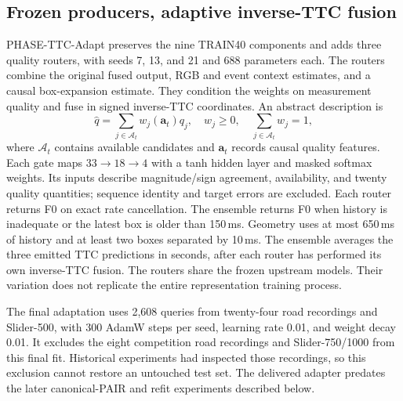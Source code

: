 \documentclass[twocolumn,letterpaper]{article}
\begin{document}
\subsection{Frozen producers, adaptive inverse-TTC fusion}
PHASE-TTC-Adapt preserves the nine TRAIN40 components and adds three quality routers, with seeds 7, 13, and 21 and 688 parameters each. The routers combine the original fused output, RGB and event context estimates, and a causal box-expansion estimate. They condition the weights on measurement quality and fuse in signed inverse-TTC coordinates. An abstract description is
\begin{equation}
 \widehat q=\sum_{j\in\mathcal A_t}w_j(\mathbf a_t)q_j,
 \quad w_j\geq0,\quad \sum_{j\in\mathcal A_t}w_j=1,
\label{eq:router}
\end{equation}
where $\mathcal A_t$ contains available candidates and $\mathbf a_t$ records causal quality features. Each gate maps $33\!\rightarrow\!18\!\rightarrow\!4$ with a tanh hidden layer and masked softmax weights. Its inputs describe magnitude/sign agreement, availability, and twenty quality quantities; sequence identity and target errors are excluded. Each router returns F0 on exact rate cancellation. The ensemble returns F0 when history is inadequate or the latest box is older than 150\,ms. Geometry uses at most 650\,ms of history and at least two boxes separated by 10\,ms. The ensemble averages the three emitted TTC predictions in seconds, after each router has performed its own inverse-TTC fusion. The routers share the frozen upstream models. Their variation does not replicate the entire representation training process.

The final adaptation uses 2,608 queries from twenty-four road recordings and Slider-500, with 300 AdamW steps per seed, learning rate 0.01, and weight decay 0.01. It excludes the eight competition road recordings and Slider-750/1000 from this final fit. Historical experiments had inspected those recordings, so this exclusion cannot restore an untouched test set. The delivered adapter predates the later canonical-PAIR and refit experiments described below.
\end{document}
